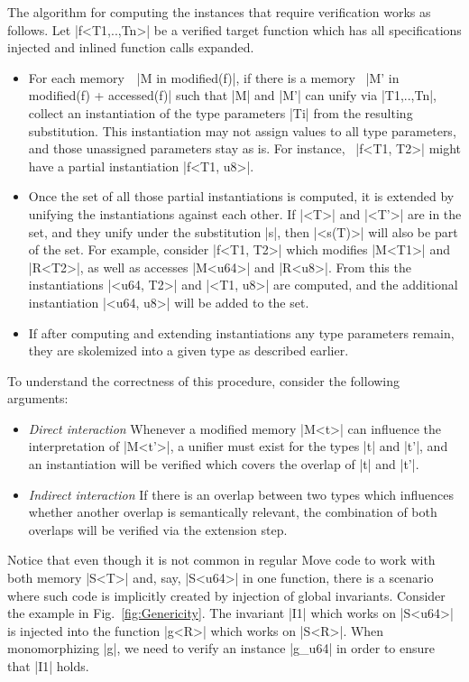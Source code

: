 The algorithm for computing the instances that require verification works as
follows. Let |f<T1,..,Tn>| be a verified target function which has all
specifications injected and inlined function calls expanded.
\begin{itemize}
\item For each memory~~|M in modified(f)|, if there is a memory~%
  |M' in modified(f) + accessed(f)| such that |M| and |M'| can unify via
  |T1,..,Tn|, collect an instantiation of the type parameters |Ti| from the
  resulting substitution. This instantiation may not assign values to all type
  parameters, and those unassigned parameters stay as is. For instance,~%
  |f<T1, T2>| might have a partial instantiation |f<T1, u8>|.
\item Once the set of all those partial instantiations is computed, it is
  extended by unifying the instantiations against each other. If |<T>| and
  |<T'>| are in the set, and they unify under the substitution |s|, then
  |<s(T)>| will also be part of the set.  For example, consider |f<T1, T2>|
  which modifies |M<T1>| and |R<T2>|, as well as accesses |M<u64>| and
  |R<u8>|. From this the instantiations |<u64, T2>| and |<T1, u8>| are computed,
  and the additional instantiation |<u64, u8>| will be added to the set.
\item If after computing and extending instantiations any type parameters
  remain, they are skolemized into a given type as described earlier.
\end{itemize}

\noindent To understand the correctness of this procedure, consider the
following arguments:

\begin{itemize}
\item \emph{Direct interaction} Whenever a modified memory |M<t>| can influence
  the interpretation of |M<t'>|, a unifier must exist for the types |t| and |t'|,
  and an instantiation will be verified which covers the overlap of |t| and
  |t'|.
\item \emph{Indirect interaction} If there is an overlap between two types
  which influences whether another overlap is semantically relevant, the
  combination of both overlaps will be verified via the extension step.
\end{itemize}

Notice that even though it is not common in regular Move code to work with both
memory |S<T>| and, say, |S<u64>| in one function, there is a scenario where such
code is implicitly created by injection of global invariants. Consider the
example in Fig.~\ref{fig:Genericity}. The invariant |I1| which works on |S<u64>|
is injected into the function |g<R>| which works on |S<R>|. When monomorphizing
|g|, we need to verify an instance |g_u64| in order to ensure that |I1| holds.



